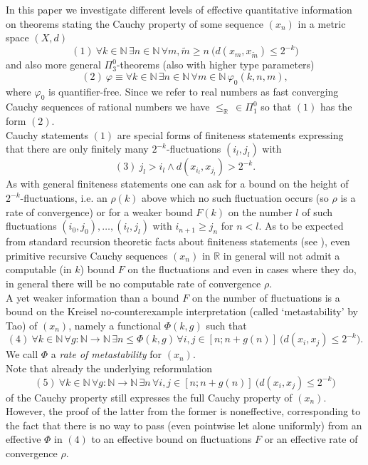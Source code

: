 \documentclass[1p]{elsarticle}
\newcommand{\RR}{\ensuremath{\mathbb{R}}}
\newcommand{\NN}{\ensuremath{\mathbb{N}}}
\theoremstyle{plain}
\theoremstyle{definition}
\theoremstyle{remark}
\theoremstyle{definition}
\begin{document}
In this paper we investigate different levels of effective quantitative 
information on theorems stating the Cauchy property of some sequence 
$(x_n)$ in a metric space $(X,d)$
\[ (1) \ \forall k\in\NN\,\exists n\in\NN\,\forall m,\tilde{m}\ge n
\ \big( d(x_m,
x_{\tilde{m}})\le 2^{-k}\big) \] 
and also more general $\Pi^0_3$-theorems (also with higher type parameters) 
\[ (2) \ \varphi\equiv 
\forall k\in\NN\,\exists n\in\NN\,
\forall m\in\NN\,\varphi_0(k,n,m),\] where $\varphi_0$ is quantifier-free. 
Since we refer to real numbers as fast 
converging Cauchy sequences of rational numbers we have $\le_{\RR}\,\in\Pi^0_1$ 
so that $(1)$ has the form $(2).$
\\[2mm] 
Cauchy statements $(1)$ are special forms of finiteness statements expressing 
that there are only finitely many $2^{-k}$-fluctuations $(i_l,j_l)$ 
with 
\[ (3) \ j_l>i_l\wedge d(x_{i_l},x_{j_l})>2^{-k}. \] 
As with general finiteness statements one can ask for a bound on the height 
of $2^{-k}$-fluctuations, i.e. an $\rho(k)$ above which no such fluctuation 
occurs (so $\rho$ is a rate of convergence) 
or for a weaker bound $F(k)$ on the number $l$ 
of such fluctuations $(i_0,j_0),\ldots,(i_l,j_l)$ with $i_{n+1}\ge j_{n}$ 
for $n<l.$ 
As to be expected from standard recursion theoretic facts about finiteness 
statements (see \cite{Luckhardt(89)}), even primitive recursive Cauchy sequences $(x_n)$ in $\RR$ 
in general will not admit a computable (in $k$) bound $F$ on the fluctuations 
and even in cases where they do, in general there will be no computable 
rate of convergence $\rho.$\\[2mm] 
A yet weaker information than a bound $F$ on the number of fluctuations is 
a bound on the Kreisel no-counterexample 
interpretation (called `metastability' by Tao) of $(x_n)$, namely a functional 
$\Phi(k,g)$ such that 
\[ (4) \ \forall k\in\NN\,\forall g:\NN\to\NN\, \exists n\le \Phi(k,g) 
\,\forall i,j \in [n;n+g(n)]\ \big( d(x_i,x_j)\le 2^{-k}\big). \] We call 
$\Phi$ a {\it rate of metastability} for $(x_n).$ \\  
Note that already the underlying reformulation 
\[ (5) \ \forall k\in \NN\,\forall g:\NN\to\NN\, \exists n
\,\forall i,j \in [n;n+g(n)]\ \big( d(x_i,x_j)\le 2^{-k}\big) \]
of the Cauchy property 
still expresses the full Cauchy property of $(x_n).$ However, the proof 
of the latter from the former is noneffective, corresponding to the fact 
that there is no way to 
pass (even pointwise let alone uniformly) 
from an effective $\Phi$ in $(4)$ to an 
effective bound on fluctuations $F$ or an effective rate of convergence $\rho.$
\end{document}
